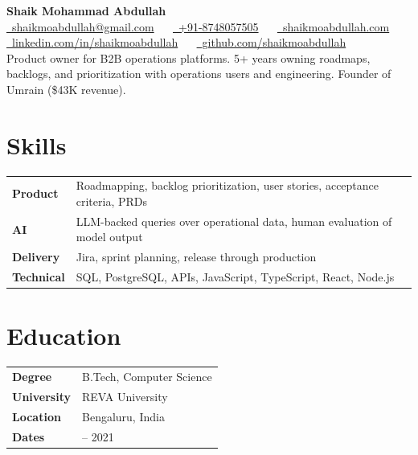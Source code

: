 \documentclass[letterpaper,11pt]{article}
\newcommand{\skill}[2]{\textbf{#1} & #2 \\}
\begin{document}
\begin{center}
  {\Huge\bfseries Shaik Mohammad Abdullah}\\[4pt]
  {\footnotesize
    \href{mailto:shaikmoabdullah@gmail.com}{\faEnvelope\ shaikmoabdullah@gmail.com} \ \textbar\ %
    \href{https://wa.me/918748057505}{\faWhatsapp\ +91-8748057505} \ \textbar\ %
    \href{https://shaikmoabdullah.com}{\faGlobe\ shaikmoabdullah.com} \ \textbar\ %
    \href{https://linkedin.com/in/shaikmoabdullah}{\faLinkedin\ linkedin.com/in/shaikmoabdullah} \ \textbar\ %
    \href{https://github.com/shaikmoabdullah}{\faGithub\ github.com/shaikmoabdullah}
  }\\[4pt]
  {\small Product owner for B2B operations platforms. 5+ years owning roadmaps, backlogs, and prioritization with operations users and engineering. Founder of Umrain (\$43K revenue).}
\end{center}

\noindent
\begin{minipage}[t]{0.66\textwidth}
\section{Skills}
\begin{tabularx}{\linewidth}{@{}l >{\raggedright\arraybackslash}X@{}}
  \skill{Product}{Roadmapping, backlog prioritization, user stories, acceptance criteria, PRDs}
  \skill{AI}{LLM-backed queries over operational data, human evaluation of model output}
  \skill{Delivery}{Jira, sprint planning, release through production}
  \skill{Technical}{SQL, PostgreSQL, APIs, JavaScript, TypeScript, React, Node.js}
\end{tabularx}
\end{minipage}\hfill
\begin{minipage}[t]{0.31\textwidth}
\section{Education}
\begin{tabularx}{\linewidth}{@{}l >{\raggedright\arraybackslash}X@{}}
  \skill{Degree}{B.Tech, Computer Science}
  \skill{University}{REVA University}
  \skill{Location}{Bengaluru, India}
  \skill{Dates}{2017 -- 2021}
\end{tabularx}
\end{minipage}
\end{document}

